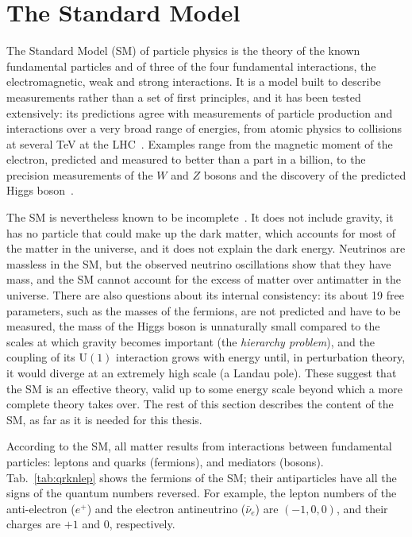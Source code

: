 \section{The Standard Model}
The Standard Model (SM) of particle physics is the theory of the known fundamental particles and of three of the four fundamental interactions, the electromagnetic, weak and strong interactions.
%
It is a model built to describe measurements rather than a set of first principles, and it has been tested extensively: its predictions agree with measurements of particle production and interactions over a very broad range of energies, from atomic physics to collisions at several TeV at the LHC~\cite{ParticleDataGroup:2026aaa}.
%
Examples range from the magnetic moment of the electron, predicted and measured to better than a part in a billion, to the precision measurements of the \(W\) and \(Z\) bosons and the discovery of the predicted Higgs boson~\cite{ParticleDataGroup:2026aaa}.

The SM is nevertheless known to be incomplete~\cite{ParticleDataGroup:2026aaa}.
%
It does not include gravity, it has no particle that could make up the dark matter, which accounts for most of the matter in the universe, and it does not explain the dark energy.
%
Neutrinos are massless in the SM, but the observed neutrino oscillations show that they have mass, and the SM cannot account for the excess of matter over antimatter in the universe.
%
There are also questions about its internal consistency: its about 19 free parameters, such as the masses of the fermions, are not predicted and have to be measured, the mass of the Higgs boson is unnaturally small compared to the scales at which gravity becomes important (the \emph{hierarchy problem}), and the coupling of its \(\mathrm{U}(1)\) interaction grows with energy until, in perturbation theory, it would diverge at an extremely high scale (a Landau pole).
%
These suggest that the SM is an effective theory, valid up to some energy scale beyond which a more complete theory takes over.
%
The rest of this section describes the content of the SM, as far as it is needed for this thesis.

According to the SM, all matter results from interactions between fundamental particles: leptons and quarks (fermions), and mediators (bosons).
Tab.~\ref{tab:qrknlep} shows the fermions of the SM; their antiparticles have all the signs of the quantum numbers reversed. For example, the lepton numbers of the anti-electron (\(e^+\)) and the electron antineutrino (\(\bar{\nu}_e\)) are \((-1, 0, 0)\), and their charges are \(+1\) and 0, respectively.


